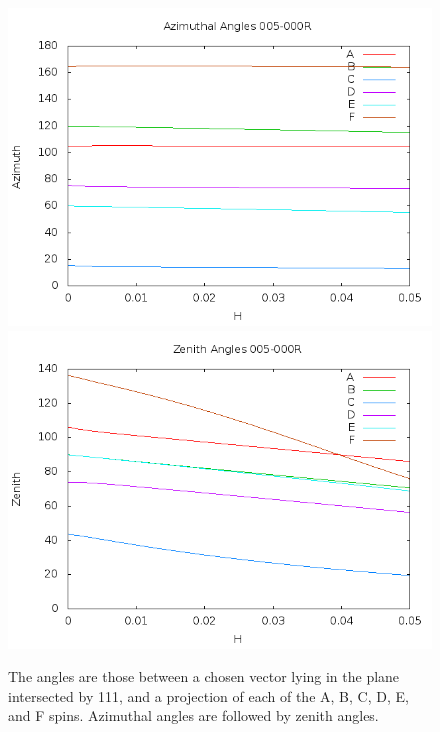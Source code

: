 \documentclass{article}
\begin{document}
\begin{figure}
\centering
\includegraphics[scale=0.5]{azim005to000R.png}
\includegraphics[scale=0.5]{zen005to000R.png}
\caption{The angles are those between a chosen vector lying in the plane intersected by 111,
and a projection of each of the A, B, C, D, E, and F  spins. Azimuthal angles are followed by zenith angles.}
\end{figure}
\pagebreak
\end{document}
